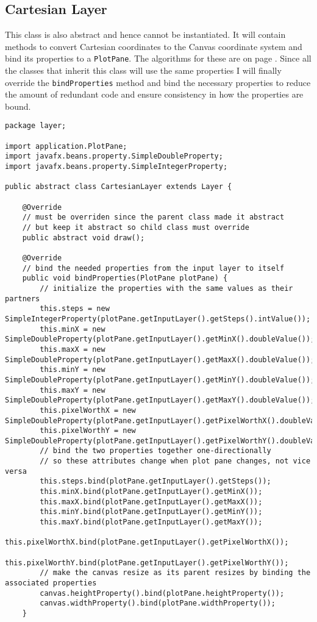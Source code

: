 \documentclass[../../../../main.tex]{subfiles}
\begin{document}
\subsection{Cartesian Layer}
This class is also abstract and hence cannot be instantiated. It will contain methods to convert Cartesian coordinates to the Canvas coordinate system and bind its properties to a \texttt{PlotPane}. The algorithms for these are on page \pageref{alg:coordConv}. Since all the classes that inherit this class will use the same properties I will finally override the \texttt{bindProperties{}} method and bind the necessary properties to reduce the amount of redundant code and ensure consistency in how the properties are bound.
\begin{verbatim}
package layer;

import application.PlotPane;
import javafx.beans.property.SimpleDoubleProperty;
import javafx.beans.property.SimpleIntegerProperty;

public abstract class CartesianLayer extends Layer {

	@Override
	// must be overriden since the parent class made it abstract
	// but keep it abstract so child class must override
	public abstract void draw();

	@Override
	// bind the needed properties from the input layer to itself
	public void bindProperties(PlotPane plotPane) {
		// initialize the properties with the same values as their partners
		this.steps = new SimpleIntegerProperty(plotPane.getInputLayer().getSteps().intValue());
		this.minX = new SimpleDoubleProperty(plotPane.getInputLayer().getMinX().doubleValue());
		this.maxX = new SimpleDoubleProperty(plotPane.getInputLayer().getMaxX().doubleValue());
		this.minY = new SimpleDoubleProperty(plotPane.getInputLayer().getMinY().doubleValue());
		this.maxY = new SimpleDoubleProperty(plotPane.getInputLayer().getMaxY().doubleValue());
		this.pixelWorthX = new SimpleDoubleProperty(plotPane.getInputLayer().getPixelWorthX().doubleValue());
		this.pixelWorthY = new SimpleDoubleProperty(plotPane.getInputLayer().getPixelWorthY().doubleValue());
		// bind the two properties together one-directionally
		// so these attributes change when plot pane changes, not vice versa
		this.steps.bind(plotPane.getInputLayer().getSteps());
		this.minX.bind(plotPane.getInputLayer().getMinX());
		this.maxX.bind(plotPane.getInputLayer().getMaxX());
		this.minY.bind(plotPane.getInputLayer().getMinY());
		this.maxY.bind(plotPane.getInputLayer().getMaxY());
		this.pixelWorthX.bind(plotPane.getInputLayer().getPixelWorthX());
		this.pixelWorthY.bind(plotPane.getInputLayer().getPixelWorthY());
		// make the canvas resize as its parent resizes by binding the associated properties
		canvas.heightProperty().bind(plotPane.heightProperty());
		canvas.widthProperty().bind(plotPane.widthProperty());
	}


\end{verbatim}
\end{document}
